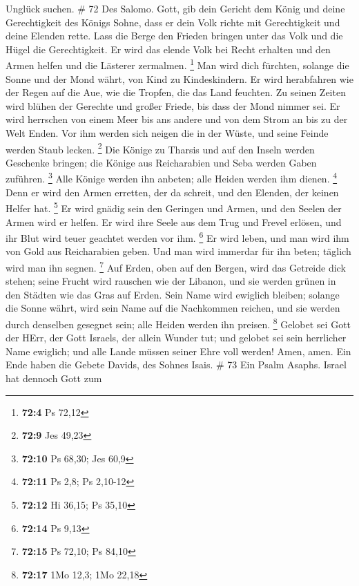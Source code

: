 Unglück suchen. \# 72  Des Salomo. Gott, gib dein Gericht
dem König und deine Gerechtigkeit des Königs Sohne,  dass er
dein Volk richte mit Gerechtigkeit und deine Elenden rette. 
Lass die Berge den Frieden bringen unter das Volk und die Hügel die
Gerechtigkeit.  Er wird das elende Volk bei Recht erhalten
und den Armen helfen und die Lästerer zermalmen. \footnote{\textbf{72:4}
  Ps 72,12}  Man wird dich fürchten, solange die Sonne und
der Mond währt, von Kind zu Kindeskindern.  Er wird
herabfahren wie der Regen auf die Aue, wie die Tropfen, die das Land
feuchten.  Zu seinen Zeiten wird blühen der Gerechte und
großer Friede, bis dass der Mond nimmer sei.  Er wird
herrschen von einem Meer bis ans andere und von dem Strom an bis zu der
Welt Enden.  Vor ihm werden sich neigen die in der Wüste,
und seine Feinde werden Staub lecken. \footnote{\textbf{72:9} Jes 49,23}
 Die Könige zu Tharsis und auf den Inseln werden Geschenke
bringen; die Könige aus Reicharabien und Seba werden Gaben zuführen.
\footnote{\textbf{72:10} Ps 68,30; Jes 60,9}  Alle Könige
werden ihn anbeten; alle Heiden werden ihm dienen. \footnote{\textbf{72:11}
  Ps 2,8; Ps 2,10-12}  Denn er wird den Armen erretten, der
da schreit, und den Elenden, der keinen Helfer hat. \footnote{\textbf{72:12}
  Hi 36,15; Ps 35,10}  Er wird gnädig sein den Geringen und
Armen, und den Seelen der Armen wird er helfen.  Er wird
ihre Seele aus dem Trug und Frevel erlösen, und ihr Blut wird teuer
geachtet werden vor ihm. \footnote{\textbf{72:14} Ps 9,13} 
Er wird leben, und man wird ihm von Gold aus Reicharabien geben. Und man
wird immerdar für ihn beten; täglich wird man ihn segnen. \footnote{\textbf{72:15}
  Ps 72,10; Ps 84,10}  Auf Erden, oben auf den Bergen, wird
das Getreide dick stehen; seine Frucht wird rauschen wie der Libanon,
und sie werden grünen in den Städten wie das Gras auf Erden.
 Sein Name wird ewiglich bleiben; solange die Sonne währt,
wird sein Name auf die Nachkommen reichen, und sie werden durch
denselben gesegnet sein; alle Heiden werden ihn preisen. \footnote{\textbf{72:17}
  1Mo 12,3; 1Mo 22,18}  Gelobet sei Gott der HErr, der Gott
Israels, der allein Wunder tut;  und gelobet sei sein
herrlicher Name ewiglich; und alle Lande müssen seiner Ehre voll werden!
Amen, amen.  Ein Ende haben die Gebete Davids, des Sohnes
Isais. \# 73  Ein Psalm Asaphs. Israel hat dennoch Gott zum
